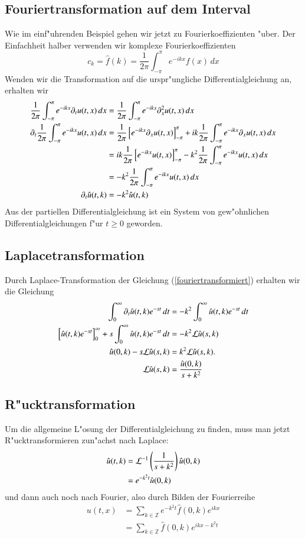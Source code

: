 \subsection{Fouriertransformation auf dem Interval}
Wie im einf"uhrenden Beispiel gehen wir jetzt zu Fourierkoeffizienten
"uber.
Der Einfachheit halber verwenden wir komplexe Fourierkoeffizienten
$$c_k=\hat f(k)=\frac1{2\pi}\int_{-\pi}^{\pi}e^{-ikx}f(x)\,dx$$
Wenden wir die Transformation auf die urspr"ungliche Differentialgleichung
an, erhalten wir
\begin{align}
\frac1{2\pi}\int_{-\pi}^{\pi}e^{-ikx}\partial_t u(t,x)\,dx
&=\frac1{2\pi}\int_{-\pi}^{\pi}e^{-ikx}\partial_x^2 u(t,x)\,dx
\notag
\\
\partial_t\frac1{2\pi}\int_{-\pi}^{\pi}e^{-ikx} u(t,x)\,dx
&=
\frac1{2\pi}
\left[
e^{-ikx}\partial_x u(t,x)
\right]_{-\pi}^{\pi}
+
ik\frac1{2\pi}\int_{-\pi}^{\pi}e^{-ikx}\partial_x u(t,x)\,dx
\notag
\\
&=
ik\frac1{2\pi}
\left[
e^{-ikx}u(t,x)
\right]_{-\pi}^{\pi}
-
k^2\frac1{2\pi}\int_{-\pi}^{\pi}e^{-ikx} u(t,x)\,dx
\notag
\\
&=
-
k^2\frac1{2\pi}\int_{-\pi}^{\pi}e^{-ikx} u(t,x)\,dx
\notag
\\
\partial_t\hat u(t,k)&=-k^2 \hat u(t,k)
\label{fouriertransformiert}
\end{align}
Aus der partiellen Differentialgleichung ist ein System von gew"ohnlichen
Differentialgleichungen f"ur $t\ge 0$ geworden.

\subsection{Laplacetransformation}
Durch Laplace-Transformation der Gleichung (\ref{fouriertransformiert})
erhalten wir die Gleichung
\begin{align*}
\int_0^{\infty} \partial_t \hat u(t,k)e^{-st}\,dt
&=
-k^2\int_0^{\infty}\hat u(t,k)e^{-st}\,dt
\\
\left[\hat u(t,k)e^{-st}\right]_0^{\infty}
+
s\int_0^{\infty}\hat u(t,k)e^{-st}\,dt
&=
-k^2{\cal L}\hat u(s,k)
\\
\hat u(0,k)-s{\cal L}\hat u(s,k)&=k^2{\cal L}\hat u(s,k).
\\
{\cal L}\hat u(s,k)&=\frac{\hat u(0,k)}{s+k^2}
\end{align*}

\subsection{R"ucktransformation}
Um die allgemeine L"osung der Differentialgleichung zu finden,
muss man jetzt R"ucktransformieren zun"achst nach Laplace:
\begin{align*}
\hat u(t,k)&={\cal L}^{-1}\left(\frac1{s+k^2}\right)\hat u(0,k)
\\
&=e^{-k^2t}\hat u(0,k)
\end{align*}
und dann auch noch nach Fourier, also durch Bilden der Fourierreihe
\begin{align*}
u(t,x)&=\sum_{k\in\mathbb Z}e^{-k^2t}\hat f(0,k)e^{ikx}
\\
&=\sum_{k\in\mathbb Z}\hat f(0,k)e^{ikx-k^2t}
\end{align*}

